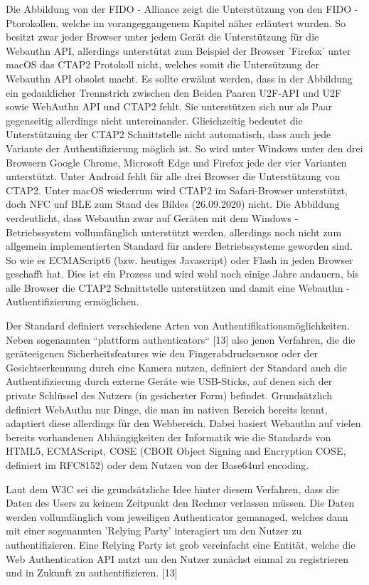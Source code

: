 Die Abbildung von der FIDO - Alliance zeigt die Unterstützung von den FIDO - Ptorokollen, welche im vorangeggangenem Kapitel näher erläutert wurden. So besitzt zwar jeder Browser unter jedem Gerät die Unterstützung für die Webauthn API, allerdings unterstützt zum Beispiel der Browser 'Firefox' unter macOS das CTAP2 Protokoll nicht, welches somit die Untersützung der Webauthn API obsolet macht. Es sollte erwähnt werden, dass in der Abbildung ein gedanklicher Trennstrich zwischen den Beiden Paaren U2F-API und U2F sowie WebAuthn API und CTAP2 fehlt. Sie unterstützen sich nur als Paar gegenseitig allerdings nicht untereinander. Glieichzeitig bedeutet die Unterstützuing der CTAP2 Schnittstelle nicht automatisch, dass auch jede Variante der Authentifizierung möglich ist. So wird unter Windows unter den drei Browsern Google Chrome, Microsoft Edge und Firefox jede der vier Varianten unterstützt. Unter Android fehlt für alle drei Browser die Unterstützung von CTAP2. Unter macOS wiederrum wird CTAP2 im Safari-Browser unterstützt, doch NFC unf BLE zum Stand des Bildes (26.09.2020) nicht. Die Abbildung verdeutlicht, dass Webauthn zwar auf Geräten mit dem Windows - Betriebssystem vollumfänglich unterstützt werden, allerdings noch nicht zum allgemein implementierten Standard für andere Betriebssysteme geworden sind. So wie es ECMAScript6 (bzw. heutiges Javascript) oder Flash in jeden Browser geschafft hat. Dies ist ein Prozess und wird wohl noch einige Jahre andauern, bis alle Browser die CTAP2 Schnittstelle unterstützen und damit eine Webauthn - Authentifizierung ermöglichen.

Der Standard definiert verschiedene Arten von Authentifikationsmöglichkeiten. Neben sogenannten ``plattform authenticators`` [13] also jenen Verfahren, die die geräteeigenen Sicherheitsfeatures wie den Fingerabdrucksensor oder der Gesichtserkennung durch eine Kamera nutzen, definiert der Standard auch die Authentifizierung durch externe Geräte wie USB-Sticks, auf denen sich der private Schlüssel des Nutzers (in gesicherter Form) befindet. Grundsätzlich definiert WebAuthn nur Dinge, die man im nativen Bereich bereits kennt, adaptiert diese allerdings für den Webbereich. Dabei basiert Webauthn auf vielen bereits vorhandenen Abhängigkeiten der Informatik wie die Standards von HTML5, ECMAScript, COSE (CBOR Object Signing and Encryption COSE, definiert im RFC8152) oder dem Nutzen von der Base64url encoding.

Laut dem W3C sei die grundsätzliche Idee hinter diesem Verfahren, dass die Daten des Users zu keinem Zeitpunkt den Rechner verlassen müssen. Die Daten werden vollumfänglich vom jeweiligen Authenticator gemanaged, welches dann mit einer sogenannten 'Relying Party' interagiert um den Nutzer zu authentifizieren. Eine Relying Party ist grob vereinfacht eine Entität, welche die Web Authentication API nutzt um den Nutzer zunächst einmal zu registrieren und in Zukunft zu authentifizieren. [13]

